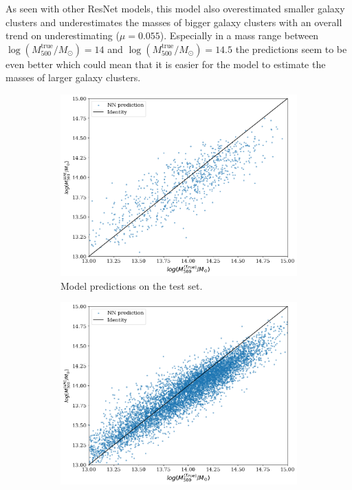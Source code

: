As seen with other ResNet models, this model also overestimated smaller galaxy clusters and underestimates the masses of bigger galaxy clusters with an overall trend on underestimating ($\mu = 0.055$). Especially in a mass range between $\log{(M_{500}^{\text{true}}/M_{\odot})} = 14$ and $\log{(M_{500}^{\text{true}}/M_{\odot})} = 14.5$ the predictions seem to be even better which could mean that it is easier for the model to estimate the masses of larger galaxy clusters.

\begin{figure}[H]
\centering
\begin{subfigure}{.46\textwidth}
  \centering
  \includegraphics[width=\linewidth]{images/Chapter4/Res152V2/res152v2_test.png}
  \caption{Model predictions on the test set.}
  \label{fig:best_perf_resnet152v2_a}
\end{subfigure}%
\hspace{.6em}
\begin{subfigure}{.46\textwidth}
  \centering
  \includegraphics[width=\linewidth]{images/Chapter4/Res152V2/res152v2_train.png}

\end{subfigure}
\end{figure}
